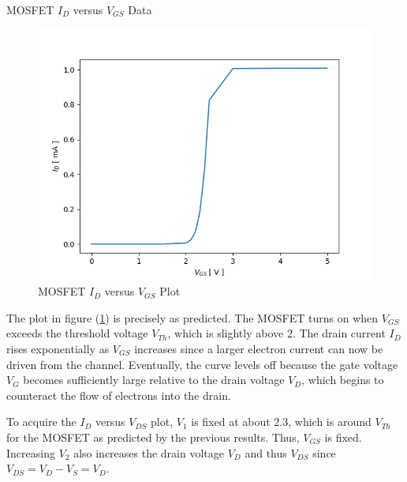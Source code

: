 \FloatBarrier

\begin{table}[h!]
	\centering
	\caption{MOSFET $I_D$ versus $V_{GS}$ Data}
	\label{tab:mosfet_id_vgs}
\end{table}

\FloatBarrier

\FloatBarrier

\begin{figure}[h!]
	\centering
	\includegraphics[scale=0.75]{../images/mosfet_id_vgs.PNG}
	\caption{MOSFET $I_D$ versus $V_{GS}$ Plot}
	\label{fig:mosfet_id_vgs}
\end{figure}

\FloatBarrier

The plot in figure (\ref{fig:mosfet_id_vgs}) is precisely as predicted. The MOSFET turns on when $V_{GS}$ exceeds the threshold voltage $V_{Th}$, which is slightly above $2$\siunitx{\volt}. The drain current $I_{D}$ rises exponentially as $V_{GS}$ increases since a larger electron current can now be driven from the channel. Eventually, the curve levels off because the gate voltage $V_{G}$ becomes sufficiently large relative to the drain voltage $V_{D}$, which begins to counteract the flow of electrons into the drain.

To acquire the $I_D$ versus $V_{DS}$ plot, $V_1$ is fixed at about $2.3$\siunitx{\volt}, which is around $V_{Th}$ for the MOSFET as predicted by the previous results. Thus, $V_{GS}$ is fixed. Increasing $V_2$ also increases the drain voltage $V_{D}$ and thus $V_{DS}$ since $V_{DS} = V_D - V_S = V_D$.

